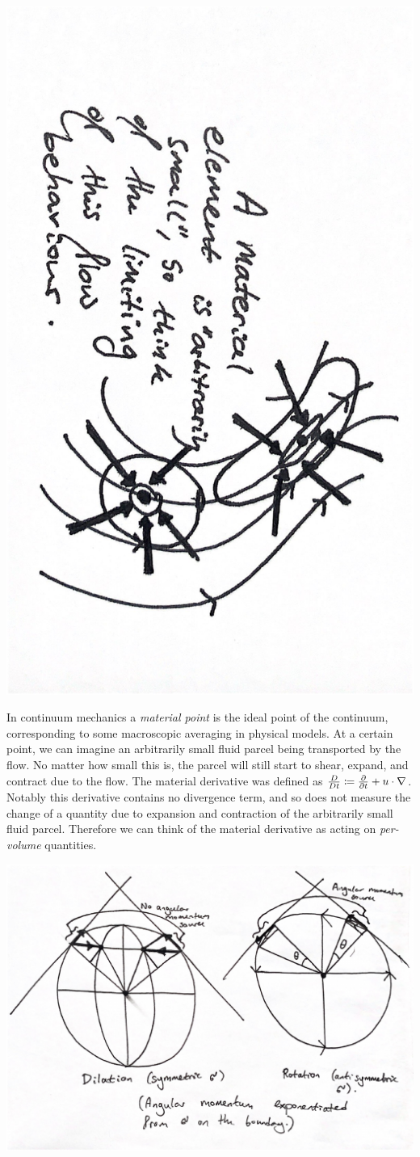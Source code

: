 \begin{center}
\includegraphics[angle=90,page=1,width=0.55\linewidth]{figures/2.pdf}
\end{center}

In continuum mechanics a \textit{material point} is the ideal point of the continuum, corresponding to some macroscopic averaging in physical models.
At a certain point, we can imagine an arbitrarily small fluid parcel being transported by the flow.
No matter how small this is, the parcel will still start to shear, expand, and contract due
to the flow.
The material derivative was defined as $\frac{D}{Dt} \coloneqq \frac{\partial }{\partial t} + u\cdot\nabla$. Notably this derivative contains no divergence term, and so does not
measure the
change of a quantity due to expansion and contraction of the arbitrarily small fluid parcel. Therefore we can think of the material derivative as acting
on \textit{per-volume} quantities.

\begin{center}
\includegraphics[page=2,width=0.66\linewidth]{figures/3.pdf}
\end{center}

